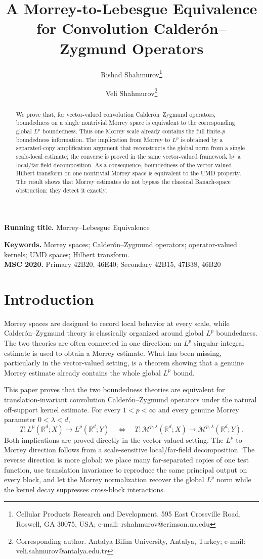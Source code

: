 \documentclass[11pt]{article}
\title{A Morrey-to-Lebesgue Equivalence for Convolution Calder\'on--Zygmund Operators}
\author{Rishad Shahmurov\thanks{Cellular Products Research and Development, 595 East Crossville Road, Roswell, GA 30075, USA; e-mail: rshahmurov@crimson.ua.edu} \and Veli Shahmurov\thanks{Corresponding author. Antalya Bilim University, Antalya, Turkey; e-mail: veli.sahmurov@antalya.edu.tr}}
\date{}
\theoremstyle{definition}
\begin{document}
\maketitle
\noindent\textbf{Running title.} Morrey--Lebesgue Equivalence\par
\medskip

\begin{abstract}
We prove that, for vector-valued convolution Calder\'on--Zygmund operators, boundedness on a single nontrivial Morrey space is equivalent to the corresponding global $L^p$ boundedness. Thus one Morrey scale already contains the full finite-$p$ boundedness information. The implication from Morrey to $L^p$ is obtained by a separated-copy amplification argument that reconstructs the global norm from a single scale-local estimate; the converse is proved in the same vector-valued framework by a local/far-field decomposition. As a consequence, boundedness of the vector-valued Hilbert transform on one nontrivial Morrey space is equivalent to the UMD property. The result shows that Morrey estimates do not bypass the classical Banach-space obstruction: they detect it exactly.
\end{abstract}

\noindent\textbf{Keywords.} Morrey spaces; Calder\'on--Zygmund operators; operator-valued kernels; UMD spaces; Hilbert transform.\\
\textbf{MSC 2020.} Primary 42B20, 46E40; Secondary 42B15, 47B38, 46B20

\section{Introduction}
Morrey spaces are designed to record local behavior at every scale, while Calder\'on--Zygmund theory is classically organized around global $L^p$ boundedness. The two theories are often connected in one direction: an $L^p$ singular-integral estimate is used to obtain a Morrey estimate. What has been missing, particularly in the vector-valued setting, is a theorem showing that a genuine Morrey estimate already contains the whole global $L^p$ bound.

This paper proves that the two boundedness theories are equivalent for translation-invariant convolution Calder\'on--Zygmund operators under the natural off-support kernel estimate. For every $1<p<\infty$ and every genuine Morrey parameter $0<\lambda<d$,
\[
T:L^p(\mathbb R^d;X)\to L^p(\mathbb R^d;Y)
\quad\Longleftrightarrow\quad
T:\mathcal M^{p,\lambda}(\mathbb R^d;X)\to\mathcal M^{p,\lambda}(\mathbb R^d;Y).
\]
Both implications are proved directly in the vector-valued setting. The $L^p$-to-Morrey direction follows from a scale-sensitive local/far-field decomposition. The reverse direction is more global: we place many far-separated copies of one test function, use translation invariance to reproduce the same principal output on every block, and let the Morrey normalization recover the global $L^p$ norm while the kernel decay suppresses cross-block interactions.
\end{document}
